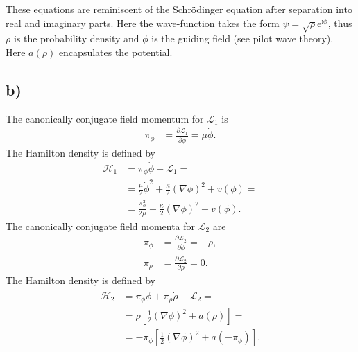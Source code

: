 \documentclass[english, parskip=full]{scrartcl}
\newcommand{\klam}{}
\renewcommand{\i}{\text{i}}
\newcommand{\e}{\text{e}}
\begin{document}
These equations are reminiscent of the Schrödinger equation after separation into real and imaginary parts.
Here the wave-function takes the form $\psi = \sqrt{\rho}\e^{\i\phi}$, thus $\rho$ is the probability density and $\phi$ is the guiding field (see pilot wave theory).
Here $a(\rho)$ encapsulates the potential.

\subsection*{b)}
The canonically conjugate field momentum for $\mathcal{L}_1$ is
\begin{align}
\pi_\phi &= \frac{\partial\mathcal{L}_1}{\partial \dot{\phi}} = \mu\dot{\phi}.
\end{align}
The Hamilton density is defined by
\begin{align}
\mathcal{H}_1 &= \pi_\phi\dot{\phi} - \mathcal{L}_1 = \\
&= \frac{\mu }{2}\dot{\phi}^2 + \frac{\kappa}{2}(\nabla\phi)^2 + v(\phi) = \\
&= \frac{\pi_\phi^2}{2\mu} + \frac{\kappa}{2}(\nabla\phi)^2 + v(\phi).
\end{align}
The canonically conjugate field momenta for $\mathcal{L}_2$ are
\begin{align}
\pi_\phi &= \frac{\partial\mathcal{L}_2}{\partial \dot{\phi}} = -\rho,\\
\pi_\rho &= \frac{\partial\mathcal{L}_2}{\partial \dot{\rho}} = 0.
\end{align}
The Hamilton density is defined by
\begin{align}
\mathcal{H}_2 &= \pi_\phi\dot{\phi} + \pi_\rho\dot{\rho} - \mathcal{L}_2 = \\
&= \rho \klam\left[ {\frac{1}{2}(\nabla\phi)^2 +  a(\rho)} \right] = \\
&= -\pi_\phi \klam\left[ {\frac{1}{2}(\nabla\phi)^2 +  a(-\pi_\phi)} \right].
\end{align}
\end{document}
